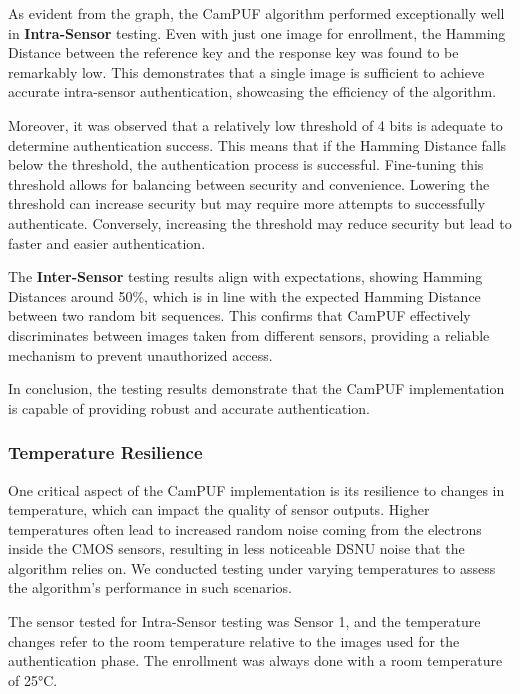 As evident from the graph, the CamPUF algorithm performed exceptionally well in \textbf{Intra-Sensor} testing. Even with just one image for enrollment, the Hamming Distance between the reference key and the response key was found to be remarkably low. This demonstrates that a single image is sufficient to achieve accurate intra-sensor authentication, showcasing the efficiency of the algorithm.

Moreover, it was observed that a relatively low threshold of 4 bits is adequate to determine authentication success. This means that if the Hamming Distance falls below the threshold, the authentication process is successful. Fine-tuning this threshold allows for balancing between security and convenience. Lowering the threshold can increase security but may require more attempts to successfully authenticate. Conversely, increasing the threshold may reduce security but lead to faster and easier authentication.

The \textbf{Inter-Sensor} testing results align with expectations, showing Hamming Distances around 50\%, which is in line with the expected Hamming Distance between two random bit sequences. This confirms that CamPUF effectively discriminates between images taken from different sensors, providing a reliable mechanism to prevent unauthorized access.

In conclusion, the testing results demonstrate that the CamPUF implementation is capable of providing robust and accurate authentication.

\subsubsection{Temperature Resilience}

One critical aspect of the CamPUF implementation is its resilience to changes in temperature, which can impact the quality of sensor outputs. Higher temperatures often lead to increased random noise coming from the electrons inside the CMOS sensors, resulting in less noticeable DSNU noise that the algorithm relies on. We conducted testing under varying temperatures to assess the algorithm's performance in such scenarios.

The sensor tested for Intra-Sensor testing was Sensor 1, and the temperature changes refer to the room temperature relative to the images used for the authentication phase. The enrollment was always done with a room temperature of 25°C.

